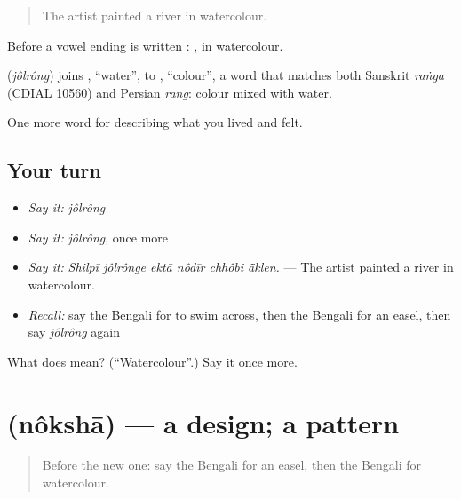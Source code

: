 \begin{quote}
The artist painted a river in watercolour.
\end{quote}

Before a vowel ending  is written : , in watercolour.

\begin{cousinweb}
\textbf{} (\emph{jôlrông}) joins , \textquotedblleft{}water\textquotedblright{}, to , \textquotedblleft{}colour\textquotedblright{}, a word that matches both Sanskrit \emph{raṅga} (CDIAL 10560) and Persian \emph{rang}: colour mixed with water.
\end{cousinweb}

\begin{grammarlens}[title={What you've built}]
One more word for describing what you lived and felt.
\end{grammarlens}

\subsection*{Your turn}
\begin{itemize}
\raggedright
  \item \emph{Say it:} \emph{jôlrông}
  \item \emph{Say it:} \emph{jôlrông}, once more
  \item \emph{Say it:} \emph{Shilpī jôlrônge ekṭā nôdīr chhôbi ā̃klen.} — The artist painted a river in watercolour.
  \item \emph{Recall:} say the Bengali for to swim across, then the Bengali for an easel, then say \emph{jôlrông} again
\end{itemize}

\begin{tcolorbox}[breakable,colback=teal!4,colframe=teal!35!black,title={Before you move on}]
What does  mean? (\textquotedblleft{}Watercolour\textquotedblright{}.) Say it once more.
\end{tcolorbox}
\section[\texorpdfstring{\bn{নকশা} (nôkshā)}{নকশা (nôkshā)}]{ (nôkshā) — a design; a pattern}

\label{lesson:BN-C524-noksha}



\begin{quote}
Before the new one: say the Bengali for an easel, then the Bengali for watercolour.
\end{quote}

